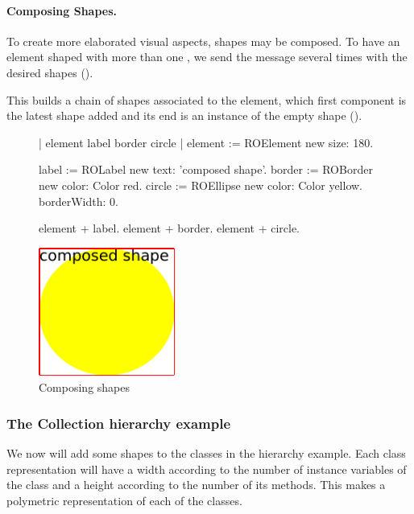 \documentclass[a4paper,10pt,twoside]{book}
\begin{document}
\paragraph{Composing Shapes.}
To create more elaborated visual aspects, shapes may be composed. To have an element shaped with more than one , we send the \ct{+} message several times with the desired shapes (). 

This builds a chain of shapes associated to the element, which first component is the latest shape added and its end is an instance of the empty shape ().

\begin{figure}[H]
      \begin{minipage}[t]{0.5\textwidth}
      \vspace{0pt}
     \begin{code}{}
| element label border circle | 
element := ROElement new 
				size: 180.
				
label := ROLabel new 
				text: 'composed shape'.
border := ROBorder new 
				color: Color red. 
circle := ROEllipse new 
				color: Color yellow.
				borderWidth: 0.
				
element + label.
element + border.
element + circle. \end{code}
   \end{minipage}
   \hfill
   \begin{minipage}[t]{0.4\textwidth}
      \vspace{0pt} \raggedright
       \centering
		\includegraphics[width=0.4\textwidth]{composed}
   \end{minipage}
\caption{Composing shapes}
\label{fig:composed}
\end{figure} 

\subsubsection{The Collection hierarchy example}
We now will add some shapes to the classes in the  hierarchy example. Each class representation will have a width according to the number of instance variables of the class and a height according to the number of its methods. This makes a polymetric representation of each of the classes.
\end{document}

